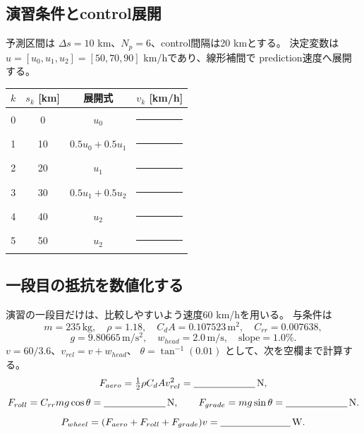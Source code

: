 \subsection{演習条件とcontrol展開}
予測区間は $\Delta s=10$ km、$N_p=6$、control間隔は20 kmとする。
決定変数は $u=[u_0,u_1,u_2]=[50,70,90]$ km/hであり、線形補間で
prediction速度へ展開する。

\begin{center}
\begin{tabular}{c c c c}
\toprule
$k$ & $s_k$ [km] & 展開式 & $v_k$ [km/h]\\
\midrule
0&0&$u_0$&\rule{20mm}{0.4pt}\\
1&10&$0.5u_0+0.5u_1$&\rule{20mm}{0.4pt}\\
2&20&$u_1$&\rule{20mm}{0.4pt}\\
3&30&$0.5u_1+0.5u_2$&\rule{20mm}{0.4pt}\\
4&40&$u_2$&\rule{20mm}{0.4pt}\\
5&50&$u_2$&\rule{20mm}{0.4pt}\\
\bottomrule
\end{tabular}
\end{center}


\subsection{一段目の抵抗を数値化する}
演習の一段目だけは、比較しやすいよう速度60 km/hを用いる。
与条件は
\[
 m=235\,\mathrm{kg},\quad \rho=1.18,\quad C_dA=0.107523\,\mathrm{m^2},
 \quad C_{rr}=0.007638,
\]
\[
g=9.80665\,\mathrm{m/s^2},\quad w_{head}=2.0\,\mathrm{m/s},
\quad \mathrm{slope}=1.0\%.
\]
$v=60/3.6$、$v_{rel}=v+w_{head}$、
$\theta=\tan^{-1}(0.01)$ として、次を空欄まで計算する。
\[
F_{aero}=\tfrac12\rho C_dA v_{rel}^2=\underline{\hspace{22mm}}\,\mathrm{N},
\]
\[
F_{roll}=C_{rr}mg\cos\theta=\underline{\hspace{22mm}}\,\mathrm{N},\qquad
F_{grade}=mg\sin\theta=\underline{\hspace{22mm}}\,\mathrm{N}.
\]
\[
P_{wheel}=(F_{aero}+F_{roll}+F_{grade})v
=\underline{\hspace{25mm}}\,\mathrm{W}.
\]


